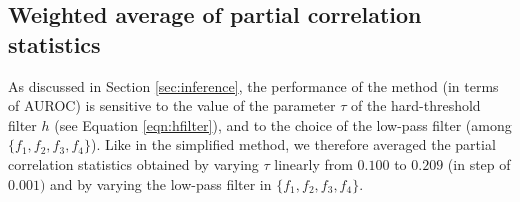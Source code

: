 \documentclass[wcp]{jmlr}
\begin{document}




\subsection{Weighted average of partial correlation statistics}
\label{sapp:averaging}

As discussed in Section \ref{sec:inference}, the performance of the method (in
terms of AUROC) is sensitive to the value of the parameter $\tau$ of the
hard-threshold filter $h$ (see Equation \ref{eqn:hfilter}), and to the choice
of the low-pass filter (among $\{f_1, f_2, f_3, f_4\}$). Like in the simplified
method, we therefore averaged the partial correlation statistics obtained by
varying $\tau$ linearly from $0.100$ to $0.209$ (in step of $0.001)$ and by
varying the low-pass filter in $\{f_1, f_2, f_3, f_4\}$.
\end{document}
